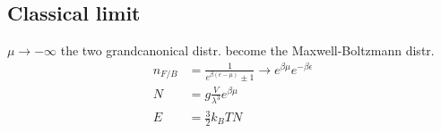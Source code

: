 \subsection*{Classical limit}
$\mu \rightarrow - \infty$ the two grandcanonical distr. become the Maxwell-Boltzmann distr.
\[
    \begin{aligned}
        n_{F/B} &= \frac{1}{e^{\beta(\epsilon-\mu)}\pm1} \rightarrow e^{\beta \mu} e^{-\beta \epsilon} \\
        N &= g \frac{V}{\lambda^3} e^{\beta \mu} \\
        E &= \frac{3}{2} k_B T N
    \end{aligned}
\]